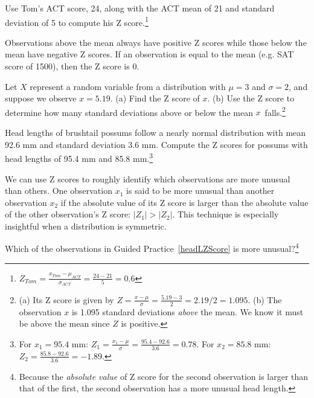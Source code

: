 \begin{exercise}
Use Tom's ACT score, 24, along with the ACT mean of 21 and standard deviation of 5 to compute his Z score.\footnote{$Z_{Tom} = \frac{x_{Tom} - \mu_{ACT}}{\sigma_{ACT}} = \frac{24 - 21}{5} = 0.6$}
\end{exercise}

Observations above the mean always have positive Z scores while those below the mean have negative Z scores. If an observation is equal to the mean (e.g. SAT score of 1500), then the Z score is $0$.

\begin{exercise}
Let $X$ represent a random variable from a distribution with $\mu = 3$ and $\sigma = 2$, and suppose we observe $x=5.19$. (a) Find the Z score of $x$. (b) Use the Z score to determine how many standard deviations above or below the mean $x$~falls.\footnote{(a) Its Z score is given by $Z = \frac{x-\mu}{\sigma} = \frac{5.19 - 3}{2} = 2.19/2 = 1.095$. (b) The observation $x$ is 1.095 standard deviations \emph{above} the mean. We know it must be above the mean since $Z$ is positive.}
\end{exercise}

\begin{exercise} \label{headLZScore}
Head lengths of brushtail possums follow a nearly normal distribution with mean 92.6 mm and standard deviation 3.6 mm. Compute the Z scores for possums with head lengths of 95.4 mm and 85.8 mm.\footnote{For $x_1=95.4$ mm: $Z_1 = \frac{x_1 - \mu}{\sigma} = \frac{95.4 - 92.6}{3.6} = 0.78$. For $x_2=85.8$ mm: $Z_2 = \frac{85.8 - 92.6}{3.6} = -1.89$.}
\end{exercise}

We can use Z scores to roughly identify which observations are more unusual than others. One observation $x_1$ is said to be more unusual than another observation $x_2$ if the absolute value of its Z score is larger than the absolute value of the other observation's Z score: $|Z_1| > |Z_2|$. This technique is especially insightful when a distribution is symmetric.

\begin{exercise}
Which of the observations in Guided Practice~\ref{headLZScore} is more unusual?\footnote{Because the \emph{absolute value} of Z score for the second observation is larger than that of the first, the second observation has a more unusual head length.}
\end{exercise}


